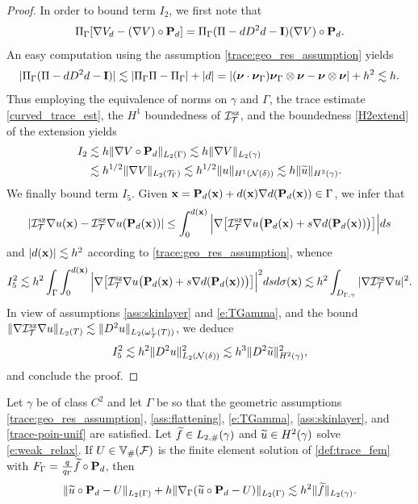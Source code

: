 \begin{proof}
In order to bound term $I_2$, we first note that
%
\[
\Pi_\Gamma [\nabla V_d-(\nabla V) \circ {\bf P}_d] = \Pi_\Gamma (\Pi-d D^2d-{\bf I}) (\nabla V) \circ {\bf P}_d.
\]
%
An easy computation using the assumption \eqref{trace:geo_res_assumption} yields
%
$$|\Pi_\Gamma(\Pi-d D^2d - {\bf I})|  \lesssim |\Pi_\Gamma \Pi-\Pi_\Gamma| + |d| =|({\boldsymbol \nu} \cdot {\boldsymbol \nu}_\Gamma) {\boldsymbol \nu}_\Gamma \otimes {\boldsymbol \nu} -{\boldsymbol \nu} \otimes {\boldsymbol \nu}|+ h^2 \lesssim h.$$
%
Thus employing the equivalence of norms on $\gamma$ and $\Gamma$, the trace estimate \eqref{curved_trace_est}, the $H^1$ boundedness of $\mathcal{I}_{\mathcal{T}}^{\textrm{sz}}$, and the boundedness \eqref{H2extend} of the extension yields
$$
\begin{aligned}
I_2 & \lesssim h \|\nabla V \circ {\bf P}_d\|_{L_2(\Gamma)} \lesssim h \|\nabla V\|_{L_2(\gamma)} 
\\& \lesssim h^{1/2} \|\nabla V\|_{L_2(\mathcal{T}_\Gamma)} 
 \lesssim h^{1/2} \|u\|_{H^1(\mathcal{N}(\delta))}
 \lesssim h \|\widetilde u\|_{H^2(\gamma)}.
\end{aligned}
$$
We finally bound term $I_5$.  Given ${\bf x}={\bf P}_d({\bf x}) + d({\bf x})\nabla d({\bf P}_d({\bf x})) \in \Gamma$, we infer that
%
\[
|\mathcal{I}_{\mathcal{T}}^{\textrm{sz}} \nabla u({\bf x})-\mathcal{I}_{\mathcal{T}}^{\textrm{sz}} \nabla u({\bf P}_d({\bf x}))| \le \int_0^{d({\bf x})} \Big| \nabla \big[\mathcal{I}_{\mathcal{T}}^{\textrm{sz}} \nabla u\big( {\bf P}_d({\bf x})+s\nabla d({\bf P}_d({\bf x}))  \big) \big] \Big| ds
\]
%
and $|d({\bf x})|\lesssim h^2$ according to \eqref{trace:geo_res_assumption}, whence 
\[
I_5^2 \lesssim h^2 \int_\Gamma \int_0^{d({\bf x})} \Big| \nabla \big[\mathcal{I}_{\mathcal{T}}^{\textrm{sz}} \nabla u\big( {\bf P}_d({\bf x})+s\nabla d({\bf P}_d({\bf x}))  \big) \big]\Big|^2 ds d\sigma({\bf x}) \lesssim h^2 \int_{D_{\Gamma,\gamma}} |\nabla \mathcal{I}_{\mathcal{T}}^{\textrm{sz}} \nabla u|^2.
\]
%
In view of assumptions \eqref{ass:skinlayer} and \eqref{e:TGamma}, and the
bound $\|\nabla \mathcal{I}_{\mathcal{T}}^{\textrm{sz}}\nabla u\|_{L_2(T)} \lesssim \|D^2 u\|_{L_2(\omega_{\mathcal{T}}^1(T))}$, we deduce
%
\[
I_5^2 \lesssim h^2 \|D^2 u\|_{L_2({\mathcal{N}(\delta)})}^2 \lesssim h^3 \|D^2 \widetilde{u}\|_{H^2(\gamma)}^2,
\]
%
and conclude the proof.
\end{proof}
  

\begin{theorem}
Let $\gamma$ be of class $C^2$ and let $\Gamma$ be so that the geometric assumptions \eqref{trace:geo_res_assumption}, \eqref{ass:flattening}, \eqref{e:TGamma}, \eqref{ass:skinlayer}, and \eqref{trace-poin-unif} are satisfied. Let $\widetilde{f}\in L_{2,\#}(\gamma)$ and $\widetilde{u}\in H^2(\gamma)$ solve \eqref{e:weak_relax}. If $U \in \mathbb{V}_\#(\mathcal F)$ is the finite element solution of \eqref{def:trace_fem} with $F_\Gamma =\frac{q}{q_\Gamma} \widetilde{f} \circ {\bf P}_d $, then
%
$$
\|\widetilde{u}\circ{\bf P}_d-U \|_{L_2(\Gamma)} + h \|\nabla_\Gamma (\widetilde{u}\circ{\bf P}_d-U)\|_{L_2(\Gamma)} \lesssim h^2 \|\widetilde{f}\|_{L_2(\gamma)}.
$$
\end{theorem}

